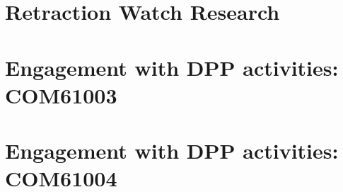 \documentclass[../main.tex]{subfiles}
\begin{document}
\appendix
\section{Retraction Watch Research}
\label{appendix:retractionwatch}



\section{Engagement with DPP activities: COM61003}
\label{appendix:COM61003}

\section{Engagement with DPP activities: COM61004}
\label{appendix:COM61004}

\end{document}
